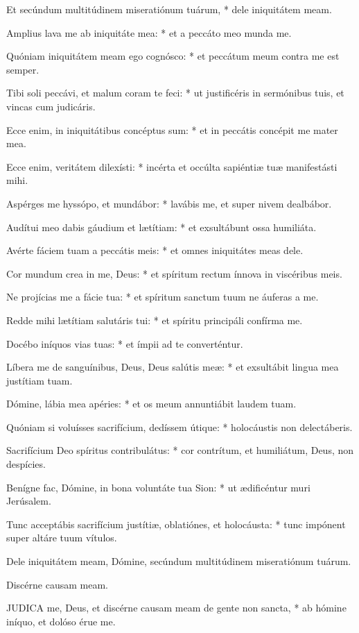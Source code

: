 Et secúndum multitúdinem miseratiónum tuárum, * dele iniquitátem meam.

Amplius lava me ab iniquitáte mea: * et a peccáto meo munda me.

Quóniam iniquitátem meam ego cognósco: * et peccátum meum contra me est semper.

Tibi soli peccávi, et malum coram te feci: * ut justificéris in sermónibus tuis, et vincas cum judicáris.

Ecce enim, in iniquitátibus concéptus sum: * et in peccátis concépit me mater mea.

Ecce enim, veritátem dilexísti: * incérta et occúlta sapiéntiæ tuæ manifestásti mihi.

Aspérges me hyssópo, et mundábor: * lavábis me, et super nivem dealbábor.

Audítui meo dabis gáudium et lætítiam: * et exsultábunt ossa humiliáta.

Avérte fáciem tuam a peccátis meis: * et omnes iniquitátes meas dele.

Cor mundum crea in me, Deus: * et spíritum rectum ínnova in viscéribus meis.

Ne projícias me a fácie tua: * et spíritum sanctum tuum ne áuferas a me.

Redde mihi lætítiam salutáris tui: * et spíritu principáli confírma me.

Docébo iníquos vias tuas: * et ímpii ad te converténtur.

Líbera me de sanguínibus, Deus, Deus salútis meæ: * et exsultábit lingua mea justítiam tuam.

Dómine, lábia mea apéries: * et os meum annuntiábit laudem tuam.

Quóniam si voluísses sacrifícium, dedíssem útique: * holocáustis non delectáberis.

Sacrifícium Deo spíritus contribulátus: * cor contrítum, et humiliátum, Deus, non despícies.

Benígne fac, Dómine, in bona voluntáte tua Sion: * ut ædificéntur muri Jerúsalem.

Tunc acceptábis sacrifícium justítiæ, oblatiónes, et holocáusta: * tunc impónent super altáre tuum vítulos.

 Dele iniquitátem meam, Dómine, secúndum multitúdinem miseratiónum tuárum.

 Discérne causam meam.


\lettrine[lines=2]{J}{UDICA} me, Deus, et discérne causam meam de gente non sancta, * ab hómine iníquo, et dolóso érue me.

